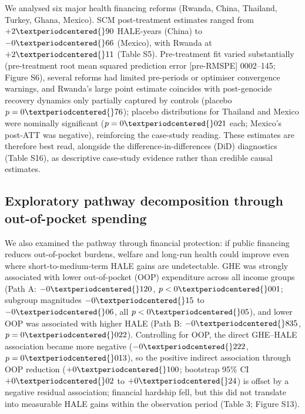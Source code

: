 \documentclass[12pt,a4paper]{article}
\begin{document}
We analysed six major health financing reforms (Rwanda, China, Thailand, Turkey, Ghana, Mexico). SCM post-treatment estimates ranged from $+2{\textperiodcentered{}}90$ HALE-years (China) to $-0{\textperiodcentered{}}66$ (Mexico), with Rwanda at $+2{\textperiodcentered{}}11$ (Table S5). Pre-treatment fit varied substantially (pre-treatment root mean squared prediction error [pre-RMSPE] 0{\textperiodcentered{}}002--1{\textperiodcentered{}}45; Figure S6), several reforms had limited pre-periods or optimiser convergence warnings, and Rwanda's large point estimate coincides with post-genocide recovery dynamics only partially captured by controls (placebo $p = 0{\textperiodcentered{}}76$); placebo distributions for Thailand and Mexico were nominally significant ($p = 0{\textperiodcentered{}}021$ each; Mexico's post-ATT was negative), reinforcing the case-study reading. These estimates are therefore best read, alongside the difference-in-differences (DiD) diagnostics (Table S16), as descriptive case-study evidence rather than credible causal estimates.



\subsection*{Exploratory pathway decomposition through out-of-pocket spending}

We also examined the pathway through financial protection: if public financing reduces out-of-pocket burdens, welfare and long-run health could improve even where short-to-medium-term HALE gains are undetectable. GHE was strongly associated with lower out-of-pocket (OOP) expenditure across all income groups (Path A: $-0{\textperiodcentered{}}120$, $p < 0{\textperiodcentered{}}001$; subgroup magnitudes $-0{\textperiodcentered{}}15$ to $-0{\textperiodcentered{}}06$, all $p < 0{\textperiodcentered{}}05$), and lower OOP was associated with higher HALE (Path B: $-0{\textperiodcentered{}}835$, $p = 0{\textperiodcentered{}}022$). Controlling for OOP, the direct GHE--HALE association became more negative ($-0{\textperiodcentered{}}222$, $p = 0{\textperiodcentered{}}013$), so the positive indirect association through OOP reduction ($+0{\textperiodcentered{}100}$; bootstrap 95\% CI $+0{\textperiodcentered{}02}$ to $+0{\textperiodcentered{}24}$) is offset by a negative residual association; financial hardship fell, but this did not translate into measurable HALE gains within the observation period (Table 3; Figure S13).
\end{document}
